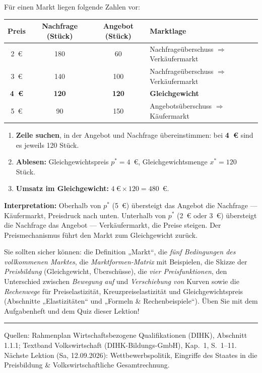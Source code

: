 \documentclass[11pt, a4paper]{article}
\begin{document}
\begin{beispiel}
Für einen Markt liegen folgende Zahlen vor:

\begin{center}
\begin{tabular}{cccl}
\textbf{Preis} & \textbf{Nachfrage (Stück)} & \textbf{Angebot (Stück)} & \textbf{Marktlage}\\
\hline
2~€ & 180 & 60  & Nachfrageüberschuss $\Rightarrow$ Verkäufermarkt\\
3~€ & 140 & 100 & Nachfrageüberschuss $\Rightarrow$ Verkäufermarkt\\
\textbf{4~€} & \textbf{120} & \textbf{120} & \textbf{Gleichgewicht}\\
5~€ & 90  & 150 & Angebotsüberschuss $\Rightarrow$ Käufermarkt\\
\end{tabular}
\end{center}

\begin{enumerate}
  \item \textbf{Zeile suchen}, in der Angebot und Nachfrage übereinstimmen: bei
    \textbf{4~€} sind es jeweils 120 Stück.
  \item \textbf{Ablesen:} Gleichgewichtspreis $p^* = 4$~€, Gleichgewichtsmenge
    $x^* = 120$ Stück.
  \item \textbf{Umsatz im Gleichgewicht:} $4~\text{€} \times 120 = 480$~€.
\end{enumerate}
\textbf{Interpretation:} Oberhalb von $p^*$ (5~€) übersteigt das Angebot die Nachfrage
--- Käufermarkt, Preisdruck nach unten. Unterhalb von $p^*$ (2~€ oder 3~€) übersteigt
die Nachfrage das Angebot --- Verkäufermarkt, die Preise steigen. Der Preismechanismus
führt den Markt zum Gleichgewicht zurück.
\end{beispiel}

\begin{merksatz}[title={\bfseries Wichtig für die Prüfungsvorbereitung}]
Sie sollten sicher können: die Definition „Markt``, die \emph{fünf Bedingungen des
vollkommenen Marktes}, die \emph{Marktformen-Matrix} mit Beispielen, die Skizze der
\emph{Preisbildung} (Gleichgewicht, Überschüsse), die \emph{vier Preisfunktionen},
den Unterschied zwischen \emph{Bewegung auf} und \emph{Verschiebung von} Kurven sowie
die \emph{Rechenwege} für Preiselastizität, Kreuzpreiselastizität und Gleichgewichtspreis
(Abschnitte „Elastizitäten`` und „Formeln \& Rechenbeispiele``).
Üben Sie mit dem Aufgabenheft und dem Quiz dieser Lektion!
\end{merksatz}

\vspace{1em}
\hrule
\vspace{0.8em}
\noindent\textsf{\small Quellen: Rahmenplan Wirtschaftsbezogene Qualifikationen (DIHK), Abschnitt 1.1.1;
Textband Volkswirtschaft (DIHK-Bildungs-GmbH), Kap.~1, S.~1--11. Nächste Lektion (Sa, 12.09.2026):
Wettbewerbspolitik, Eingriffe des Staates in die Preisbildung \& Volkswirtschaftliche Gesamtrechnung.}
\end{document}
